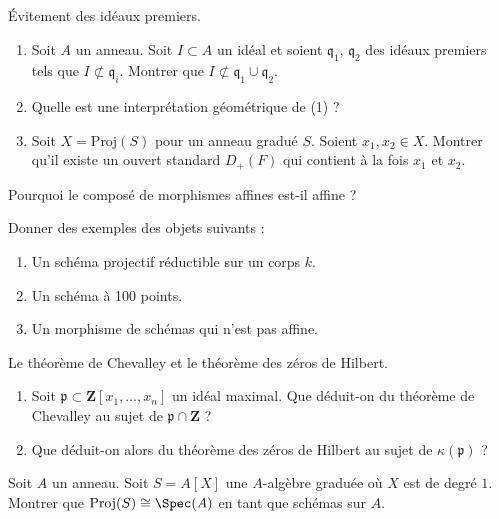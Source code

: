 \begin{exercise}
\label{exercise-prime-avoidance}
Évitement des idéaux premiers.
\begin{enumerate}
\item Soit $A$ un anneau. Soit $I \subset A$ un idéal et
soient $\mathfrak q_1$, $\mathfrak q_2$ des idéaux premiers tels que
$I \not \subset \mathfrak q_i$. Montrer que
$I \not \subset \mathfrak q_1 \cup \mathfrak q_2$.
\item Quelle est une interprétation géométrique de (1) ?
\item Soit $X = \text{Proj}(S)$ pour un anneau gradué $S$.
Soient $x_1, x_2 \in X$. Montrer qu'il existe un ouvert standard
$D_{+}(F)$ qui contient à la fois $x_1$ et $x_2$.
\end{enumerate}
\end{exercise}

\begin{exercise}
\label{exercise-compose-affine}
Pourquoi le composé de morphismes affines est-il affine ?
\end{exercise}

\begin{exercise}[Exemples]
\label{exercise-examples}
Donner des exemples des objets suivants :
\begin{enumerate}
\item Un schéma projectif réductible sur un corps $k$.
\item Un schéma à 100 points.
\item Un morphisme de schémas qui n'est pas affine.
\end{enumerate}
\end{exercise}

\begin{exercise}
\label{exercise-chevalley-hilbert-nullstellensatz}
Le théorème de Chevalley et le théorème des zéros de Hilbert.
\begin{enumerate}
\item Soit $\mathfrak p \subset \mathbf{Z}[x_1, \ldots, x_n]$
un idéal maximal. Que déduit-on du théorème de Chevalley au sujet de
$\mathfrak p \cap \mathbf{Z}$ ?
\item Que déduit-on alors du théorème des zéros de Hilbert au sujet de
$\kappa(\mathfrak p)$ ?
\end{enumerate}
\end{exercise}

\begin{exercise}
\label{exercise-P0}
Soit $A$ un anneau. Soit $S = A[X]$ une $A$-algèbre graduée
où $X$ est de degré $1$. Montrer que $\text{Proj}(S) \cong \Spec(A)$
en tant que schémas sur $A$.
\end{exercise}

